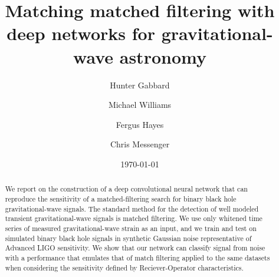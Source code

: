 \documentclass[%
showpacs,
 amsmath,amssymb,
 aps,
 twocolumn,
 prl,
 reprint,
floatfix,
]{revtex4-1}
\newcommand{\dcc}{LIGO-P1700378}
\begin{document}

%
%
\title{Matching matched filtering with deep networks for gravitational-wave astronomy}

\author{Hunter Gabbard}
\author{Michael Williams}
\author{Fergus Hayes}
\author{Chris Messenger}

\date{\today}%


%
%
\begin{abstract} 
%
We report on the construction of a deep convolutional neural network that can
reproduce the sensitivity of a matched-filtering search for binary black hole
gravitational-wave signals. The standard method for the detection of well
modeled transient gravitational-wave signals is matched filtering. 
We use only whitened time
series of measured gravitational-wave strain as an input, and we train and test
on simulated binary black hole signals in synthetic Gaussian noise
representative of Advanced LIGO sensitivity. We show that our network can
classify signal from noise with a performance that emulates that of match
filtering applied to the same datasets when considering the sensitivity defined
by Reciever-Operator characteristics.
%
\end{abstract}



\end{document}
